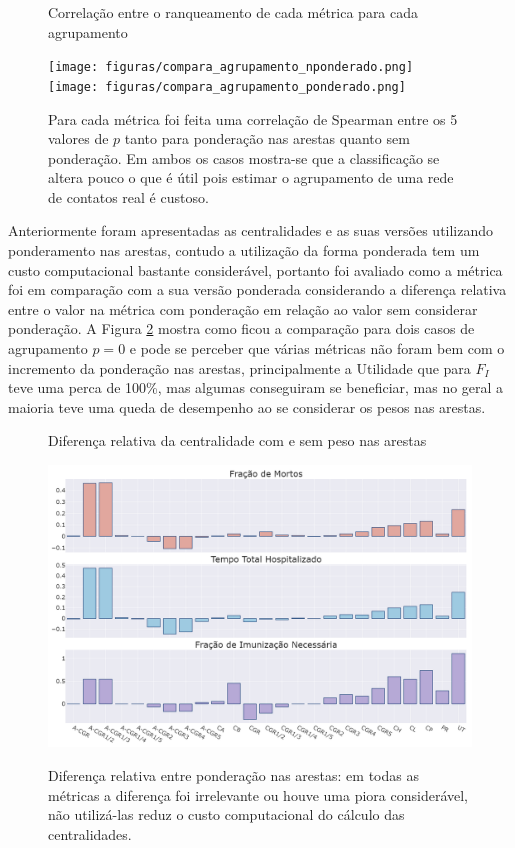 \begin{figure}[H]
    \centering
    \captionsetup{font=normalsize,skip=0.8pt,singlelinecheck=on,labelsep=endash}
    \caption{Correlação entre o ranqueamento de cada métrica para cada agrupamento}
    
    \texttt{[image: figuras/compara\_agrupamento\_nponderado.png]}
    \\
    \texttt{[image: figuras/compara\_agrupamento\_ponderado.png]}
    \captionsetup{font=small,justification=justified}
    \caption*{Para cada métrica foi 
    feita uma correlação de Spearman entre os 5 valores de $p$ tanto para ponderação nas arestas quanto sem ponderação. Em ambos os casos mostra-se que a classificação se altera pouco o que é útil pois estimar o agrupamento de uma rede de contatos real é custoso.}
    \label{fig:Spearman_p}
\end{figure}

Anteriormente foram apresentadas as centralidades e as suas versões utilizando ponderamento nas arestas, contudo a utilização da forma ponderada tem um custo computacional bastante considerável, portanto foi avaliado como a métrica foi em comparação com a sua versão ponderada considerando a diferença relativa entre o valor na métrica com ponderação em relação ao valor sem considerar ponderação. A Figura \ref{fig:compara_pesos} mostra como ficou a comparação para dois casos de agrupamento $p = 0$ e pode se perceber que várias métricas não foram bem com o incremento da ponderação nas arestas, principalmente a Utilidade que para $F_I$ teve uma perca de 100\%, mas algumas conseguiram se beneficiar, mas no geral 
a maioria teve uma queda de desempenho ao se considerar os pesos nas arestas.

\begin{figure}[H]
    \centering
    \captionsetup{font=normalsize,skip=0.8pt,singlelinecheck=on,labelsep=endash}
    \caption{Diferença relativa da centralidade com e sem peso nas arestas}
    
    \includegraphics[scale= 0.3]{figuras/compara_pesos_0.0.png}
    \\
    \captionsetup{font=small,justification=justified}
    \caption*{Diferença relativa entre ponderação nas arestas: em todas as métricas a diferença foi irrelevante ou houve uma piora considerável, não utilizá-las reduz o custo computacional do cálculo das centralidades.}
    \label{fig:compara_pesos}
\end{figure}

